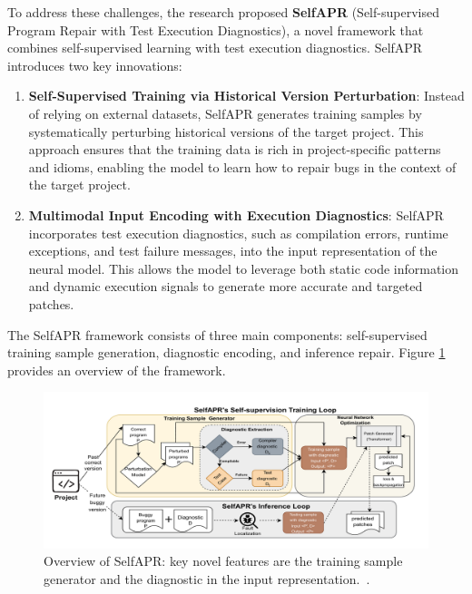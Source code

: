\documentclass[manuscript,screen,review]{acmart}
\begin{document}
To address these challenges, the research proposed \textbf{SelfAPR} (Self-supervised Program Repair with Test Execution Diagnostics)\cite{selfapr_paper}, a novel framework that combines self-supervised learning with test execution diagnostics. SelfAPR introduces two key innovations:

\begin{enumerate}
\item \textbf{Self-Supervised Training via Historical Version Perturbation}: Instead of relying on external datasets, SelfAPR generates training samples by systematically perturbing historical versions of the target project. This approach ensures that the training data is rich in project-specific patterns and idioms, enabling the model to learn how to repair bugs in the context of the target project.

\item \textbf{Multimodal Input Encoding with Execution Diagnostics}: SelfAPR incorporates test execution diagnostics, such as compilation errors, runtime exceptions, and test failure messages, into the input representation of the neural model. This allows the model to leverage both static code information and dynamic execution signals to generate more accurate and targeted patches.
\end{enumerate}

The SelfAPR framework consists of three main components: self-supervised training sample generation, diagnostic encoding, and inference repair. Figure \ref{fig:APRframework} provides an overview of the framework.

\begin{figure}[htbp]
  \centering
  \includegraphics[width=0.85\linewidth]{picture/APRframework.png}
  \caption{Overview of SelfAPR: key novel features are the training sample generator and the diagnostic in the input representation.~\cite{selfapr_paper}.}
  \label{fig:APRframework}
\end{figure}
\end{document}
